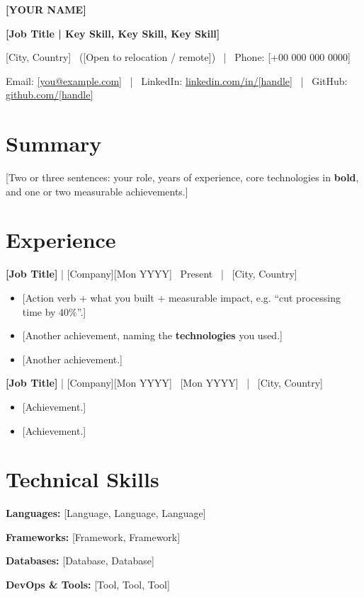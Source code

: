\documentclass[10pt,a4paper]{article}
\newcommand{\role}[4]{%
  {\bfseries #1} \textcolor{accent}{| #2}\hfill {\small\color{muted}#3 \ | \ #4}\par}
\newcommand{\skillrow}[2]{{\bfseries\color{accent}#1:} #2\par\vspace{1.5pt}}
\begin{document}
{\Huge\bfseries\color{primary}[YOUR NAME]}\par
\vspace{2pt}
{\large\bfseries\color{accent}[Job Title | Key Skill, Key Skill, Key Skill]}\par
\vspace{4pt}
{\small
[City, Country] \ ([Open to relocation / remote]) \ | \
Phone: [+00 000 000 0000] \par
Email: \href{mailto:[you@example.com]}{[you@example.com]} \ | \
LinkedIn: \href{https://linkedin.com/in/[handle]}{linkedin.com/in/[handle]} \ | \
GitHub: \href{https://github.com/[handle]}{github.com/[handle]}
}

\section{Summary}
[Two or three sentences: your role, years of experience, core technologies in \textbf{bold}, and one or two measurable achievements.]

\section{Experience}
\role{[Job Title]}{[Company]}{[Mon YYYY] \textendash\ Present}{[City, Country]}
\begin{itemize}
  \item{} [Action verb + what you built + measurable impact, e.g. ``cut processing time by 40\%''.]
  \item{} [Another achievement, naming the \textbf{technologies} you used.]
  \item{} [Another achievement.]
\end{itemize}
\vspace{3pt}
\role{[Job Title]}{[Company]}{[Mon YYYY] \textendash\ [Mon YYYY]}{[City, Country]}
\begin{itemize}
  \item{} [Achievement.]
  \item{} [Achievement.]
\end{itemize}

\section{Technical Skills}
\skillrow{Languages}{[Language, Language, Language]}
\skillrow{Frameworks}{[Framework, Framework]}
\skillrow{Databases}{[Database, Database]}
\skillrow{DevOps \& Tools}{[Tool, Tool, Tool]}
\end{document}
